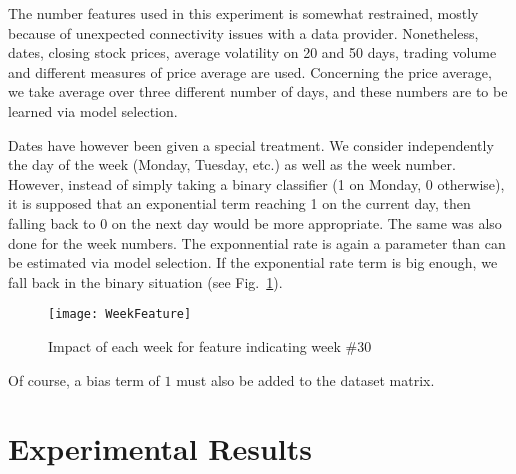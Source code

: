 \documentclass[11pt,fleqn]{article}
\newcommand{\figref}[1]{Fig.~\ref{#1}}
\begin{document}
The number features used in this experiment is somewhat restrained, mostly because of
unexpected connectivity issues with a data provider. Nonetheless, dates, closing stock
prices, average volatility on 20 and 50 days, trading volume and different measures of
price average are used. Concerning the price average, we take average over three different
number of days, and these numbers are to be learned via model selection. 

Dates have however been given a special treatment. We consider independently the day of
the week (Monday, Tuesday, etc.) as well as the week number. However, instead of simply
taking a binary classifier (1 on Monday, 0 otherwise), it is supposed that an exponential
term reaching 1 on the current day, then falling back to 0 on the next day would be more
appropriate. The same was also done for the week numbers. The exponnential rate is again a
parameter than can be estimated via model selection. If the exponential rate term is big
enough, we fall back in the binary situation (see \figref{fig:weekfeature}).

\begin{figure}
  \centering
  \texttt{[image: WeekFeature]}
  \caption{Impact of each week for feature indicating week \#30}
  \label{fig:weekfeature}
\end{figure}

Of course, a bias term of $1$ must also be added to the dataset matrix. 


\section{Experimental Results}
\end{document}
